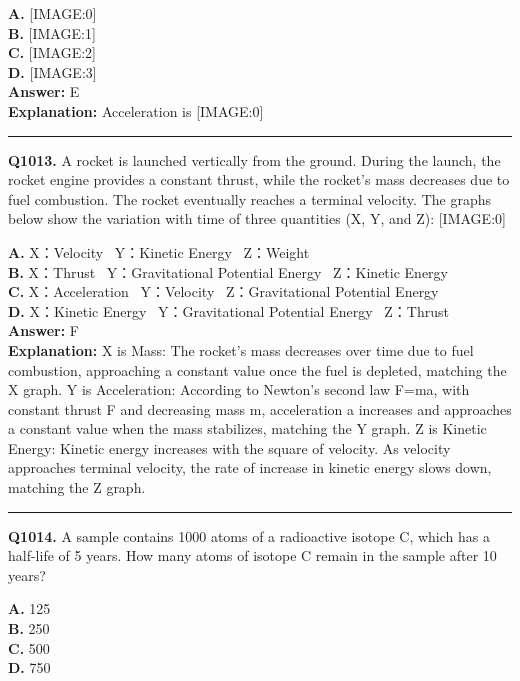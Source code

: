 \documentclass[12pt]{article}
\begin{document}
\textbf{A.} [IMAGE:0] \\
\textbf{B.} [IMAGE:1] \\
\textbf{C.} [IMAGE:2] \\
\textbf{D.} [IMAGE:3] \\

\textbf{Answer:} E \\
\textbf{Explanation:} Acceleration is
[IMAGE:0]

\hrule
\vspace{1em}


\noindent
\textbf{Q1013.} A rocket is launched vertically from the ground. During the launch, the rocket engine provides a constant thrust, while the rocket's mass decreases due to fuel combustion. The rocket eventually reaches a terminal velocity. The graphs below show the variation with time of three quantities (X, Y, and Z):
[IMAGE:0]



\textbf{A.} X：Velocity  Y：Kinetic Energy  Z：Weight \\
\textbf{B.} X：Thrust  Y：Gravitational Potential Energy  Z：Kinetic Energy \\
\textbf{C.} X：Acceleration  Y：Velocity  Z：Gravitational Potential Energy \\
\textbf{D.} X：Kinetic Energy  Y：Gravitational Potential Energy  Z：Thrust \\

\textbf{Answer:} F \\
\textbf{Explanation:} \cdot 
X is Mass: The rocket's mass decreases over time due to fuel combustion, approaching a constant value once the fuel is depleted, matching the X graph.
\cdot 
Y is Acceleration: According to Newton's second law F=ma, with constant thrust F and decreasing mass m, acceleration a increases and approaches a constant value when the mass stabilizes, matching the Y graph.
\cdot 
Z is Kinetic Energy: Kinetic energy increases with the square of velocity. As velocity approaches terminal velocity, the rate of increase in kinetic energy slows down, matching the Z graph.

\hrule
\vspace{1em}


\noindent
\textbf{Q1014.} A sample contains 1000 atoms of a radioactive isotope C, which has a half-life of 5 years. How many atoms of isotope C remain in the sample after 10 years?



\textbf{A.} 125 \\
\textbf{B.} 250 \\
\textbf{C.} 500 \\
\textbf{D.} 750 \\
\end{document}
